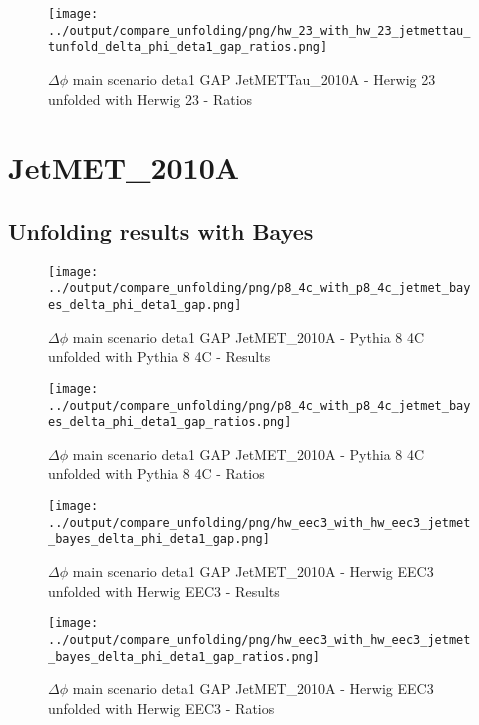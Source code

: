 \documentclass[11pt]{book}
\begin{document}
\begin{figure}[ht]
\centering
\texttt{[image: ../output/compare\_unfolding/png/hw\_23\_with\_hw\_23\_jetmettau\_tunfold\_delta\_phi\_deta1\_gap\_ratios.png]}
\caption{$\Delta\phi$ main scenario deta1 GAP JetMETTau\_2010A - Herwig 23 unfolded with Herwig 23 - Ratios}
\label{hw_23_hw_23_jetmettau_tunfold_delta_phi_deta1_gap_b}
\end{figure}


\section{JetMET\_2010A}
\subsection{Unfolding results with Bayes}

\begin{figure}[ht]
\centering
\texttt{[image: ../output/compare\_unfolding/png/p8\_4c\_with\_p8\_4c\_jetmet\_bayes\_delta\_phi\_deta1\_gap.png]}
\caption{$\Delta\phi$ main scenario deta1 GAP JetMET\_2010A - Pythia 8 4C unfolded with Pythia 8 4C - Results}
\label{p8_p8_jetmet_bayes_delta_phi_deta1_gap_a}
\end{figure}

\begin{figure}[ht]
\centering
\texttt{[image: ../output/compare\_unfolding/png/p8\_4c\_with\_p8\_4c\_jetmet\_bayes\_delta\_phi\_deta1\_gap\_ratios.png]}
\caption{$\Delta\phi$ main scenario deta1 GAP JetMET\_2010A - Pythia 8 4C unfolded with Pythia 8 4C - Ratios}
\label{p8_p8_jetmet_bayes_delta_phi_deta1_gap_b}
\end{figure}

\begin{figure}[ht]
\centering
\texttt{[image: ../output/compare\_unfolding/png/hw\_eec3\_with\_hw\_eec3\_jetmet\_bayes\_delta\_phi\_deta1\_gap.png]}
\caption{$\Delta\phi$ main scenario deta1 GAP JetMET\_2010A - Herwig EEC3 unfolded with Herwig EEC3 - Results}
\label{hw_eec3_hw_eec3_jetmet_bayes_delta_phi_deta1_gap_a}
\end{figure}

\begin{figure}[ht]
\centering
\texttt{[image: ../output/compare\_unfolding/png/hw\_eec3\_with\_hw\_eec3\_jetmet\_bayes\_delta\_phi\_deta1\_gap\_ratios.png]}
\caption{$\Delta\phi$ main scenario deta1 GAP JetMET\_2010A - Herwig EEC3 unfolded with Herwig EEC3 - Ratios}
\label{hw_eec3_hw_eec3_jetmet_bayes_delta_phi_deta1_gap_b}
\end{figure}
\end{document}

